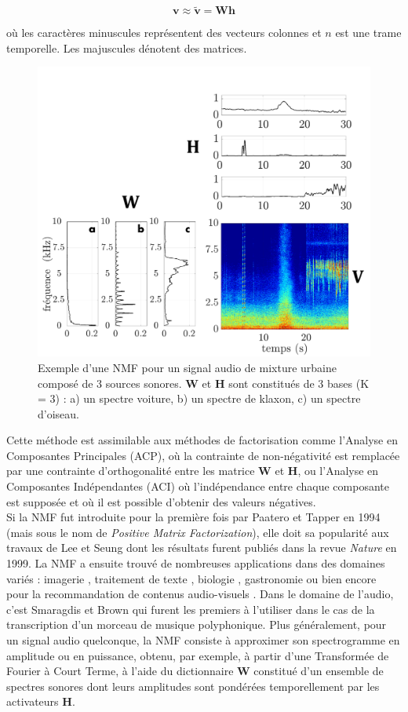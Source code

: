 \begin{equation}\label{eq:nmf_h}
\mathbf{v} \approx \mathbf{\tilde{v}} =  \mathbf{Wh}
\end{equation}

où les caractères minuscules représentent des vecteurs colonnes et $n$ est une trame temporelle. Les majuscules dénotent des matrices.

\begin{figure}[t]
\centering
\includegraphics[width=.5\textwidth]{./figures/NMF/schema_introduction_nmf_fr.pdf}
\caption{Exemple d'une NMF pour un signal audio de mixture urbaine composé de 3 sources sonores. $\mathbf{W}$ et $\mathbf{H}$ sont constitués de 3 bases (K = 3) : a) un spectre voiture, b) un spectre de klaxon, c) un spectre d'oiseau.}
\label{fig:ex_NMF}
\end{figure}


Cette méthode est assimilable aux méthodes de factorisation comme l'Analyse en Composantes Principales (ACP), où la contrainte de non-négativité est remplacée par une contrainte d'orthogonalité entre les matrice $\mathbf{W}$ et $\mathbf{H}$, ou l'Analyse en Composantes Indépendantes (ACI) où l'indépendance entre chaque composante est supposée et où il est possible d'obtenir des valeurs négatives. \\

Si la NMF fut introduite pour la première fois par Paatero et Tapper \cite{paatero_positive_1994} en 1994 (mais sous le nom de \textit{Positive Matrix Factorization}), elle doit sa popularité aux travaux de Lee et Seung \cite{lee_learning_1999} dont les résultats furent publiés dans la revue \textit{Nature} en 1999. La NMF a ensuite trouvé de nombreuses applications dans des domaines variés : imagerie \cite{guillamet_introducing_2003, monga_robust_2007}, traitement de texte \cite{xu_document_2003, berry_email_2005}, biologie \cite{gao_improving_2005, chen_constrained_nodate}, gastronomie \cite{hawkins_clustering_2006} ou bien encore pour la recommandation de contenus audio-visuels \cite{luo2014efficient}. Dans le domaine de l'audio, c'est Smaragdis et Brown \cite{smaragdis_non-negative_2003} qui furent les premiers à l'utiliser dans le cas de la transcription d'un morceau de musique polyphonique. Plus généralement, pour un signal audio quelconque, la NMF consiste à approximer son spectrogramme en amplitude ou en puissance, obtenu, par exemple, à partir d'une Transformée de Fourier à Court Terme, à l'aide du dictionnaire $\textbf{W}$ constitué d'un ensemble de spectres sonores dont leurs amplitudes sont pondérées temporellement par les activateurs $\textbf{H}$.

